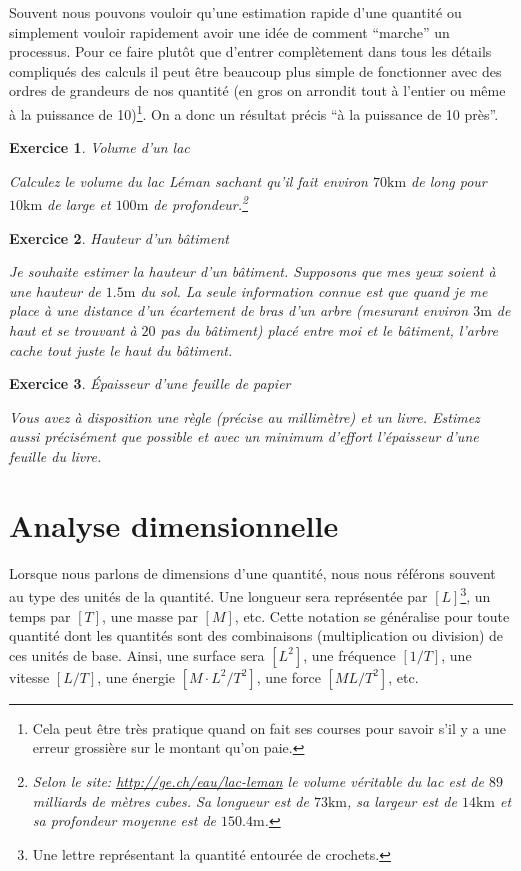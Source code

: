 \documentclass[a4paper,12pt]{book}
\newtheorem{exercice}{Exercice}
\newcommand{\km}{\mathrm{km}}
\newcommand{\m}{\mathrm{m}}
\begin{document}
Souvent nous pouvons vouloir qu'une estimation rapide d'une quantité ou simplement vouloir rapidement avoir une idée 
de comment ``marche'' un processus. Pour ce faire plutôt que d'entrer complètement dans tous les détails compliqués des calculs
il peut être beaucoup plus simple de fonctionner avec des ordres de grandeurs de nos quantité (en gros on arrondit tout à l'entier ou même 
à la puissance de 10)\footnote{Cela peut être très pratique quand on fait ses courses pour savoir s'il y a une erreur grossière sur le montant qu'on paie.}.
On a donc un résultat précis ``à la puissance de 10 près''. 
\begin{exercice}{Volume d'un lac}

 Calculez le volume du lac Léman sachant qu'il fait environ $70\km$ de long pour $10\km$ de large et $100\m$ de profondeur.\footnote{Selon le site: \url{http://ge.ch/eau/lac-leman} le volume véritable du lac est de $89$ milliards de mètres cubes. Sa longueur est de $73\km$, sa largeur est de $14\km$ et sa profondeur moyenne est de $150.4\m$.}
\end{exercice}
\begin{exercice}{Hauteur d'un bâtiment}

Je souhaite estimer la hauteur d'un bâtiment. Supposons que mes yeux soient à une hauteur de $1.5\m$ du sol. La seule information connue est que quand je me place 
à une distance d'un écartement de bras d'un arbre (mesurant environ $3\m$ de haut et se trouvant à $20$ pas du bâtiment) placé entre moi et le bâtiment, 
l'arbre cache tout juste le haut du bâtiment.
\end{exercice}

\begin{exercice}{Épaisseur d'une feuille de papier}

Vous avez à disposition une règle (précise au millimètre) et un livre. 
Estimez aussi précisément que possible et avec un minimum d'effort
l'épaisseur d'une feuille du livre.
\end{exercice}

\section{Analyse dimensionnelle}

Lorsque nous parlons de dimensions d'une quantité, nous nous référons souvent au type des unités de la quantité. Une longueur 
sera représentée par $[L]$\footnote{Une lettre représentant la quantité entourée de crochets.}, un temps par $[T]$, une masse par $[M]$, etc.
Cette notation se généralise pour toute quantité dont les quantités sont des combinaisons (multiplication ou division) de ces unités de base. Ainsi, une surface sera $[L^2]$,
une fréquence $[1/T]$, une vitesse $[L/T]$, une énergie $[M\cdot L^2/T^2]$, une force $[M L/T^2]$, etc.
\end{document}
